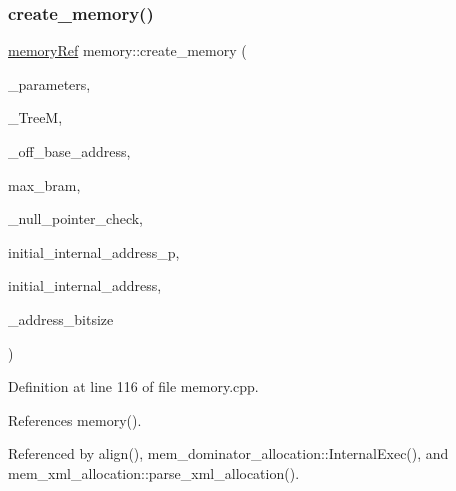 \subsubsection{\texorpdfstring{create\+\_\+memory()}{create\_memory()}}
{\footnotesize\ttfamily \hyperlink{memory_8hpp_aec1333ec6cd561731fb3ed3e55b9caf5}{memory\+Ref} memory\+::create\+\_\+memory (\begin{DoxyParamCaption}\item[{const \hyperlink{Parameter_8hpp_a37841774a6fcb479b597fdf8955eb4ea}{Parameter\+Const\+Ref}}]{\+\_\+parameters,  }\item[{const \hyperlink{tree__manager_8hpp_a96ff150c071ce11a9a7a1e40590f205e}{tree\+\_\+manager\+Ref}}]{\+\_\+\+TreeM,  }\item[{unsigned int}]{\+\_\+off\+\_\+base\+\_\+address,  }\item[{unsigned int}]{max\+\_\+bram,  }\item[{bool}]{\+\_\+null\+\_\+pointer\+\_\+check,  }\item[{bool}]{initial\+\_\+internal\+\_\+address\+\_\+p,  }\item[{unsigned int}]{initial\+\_\+internal\+\_\+address,  }\item[{const unsigned int \&}]{\+\_\+address\+\_\+bitsize }\end{DoxyParamCaption})\hspace{0.3cm}{\ttfamily [static]}}



Definition at line 116 of file memory.\+cpp.



References memory().



Referenced by align(), mem\+\_\+dominator\+\_\+allocation\+::\+Internal\+Exec(), and mem\+\_\+xml\+\_\+allocation\+::parse\+\_\+xml\+\_\+allocation().

